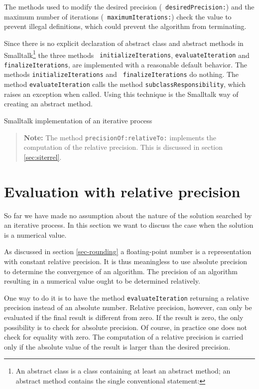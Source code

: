 \documentclass[twoside]{book}
\begin{document}
The methods used to modify the desired precision ({\tt
desiredPrecision:}) and the maximum number of iterations ({\tt
maximumIterations:}) check the value to prevent illegal
definitions, which could prevent the algorithm from terminating.

Since there is no explicit declaration of abstract class and
abstract methods in Smalltalk\footnote{An abstract class is a
class containing at least an abstract method; an abstract method
contains the single conventional statement: \hfil\break{}} the three methods {\tt
initializeIterations}, {\tt evaluateIteration} and {\tt
finalizeIterations}, are implemented with a reasonable default
behavior. The methods {\tt initializeIterations} and {\tt
finalizeIterations} do nothing. The method {\tt evaluateIteration}
calls the method {\tt subclassResponsibility}, which raises an
exception when called. Using this technique is the Smalltalk way
of creating an abstract method.
\begin{listing} Smalltalk implementation of an iterative process
\label{ls:iteration}

\end{listing}
\begin{quote}
{\bf Note:} The method {\tt precisionOf:relativeTo:} implements
the computation of the relative precision. This is discussed in
section \ref{sec:siterrel}.
\end{quote}


\section{Evaluation with relative precision}
\label{sec:iterrel} So far we have made no
assumption about the nature of the solution searched by an
iterative process. In this section we want to discuss the case
when the solution is a numerical value.

As discussed in section \ref{sec-rounding} a floating-point number
is a representation with constant relative precision. It is thus
meaningless to use absolute precision to determine the convergence
of an algorithm. The precision of an algorithm resulting in a
numerical value ought to be determined relatively.

One way to do it is to have the method {\tt evaluateIteration}
returning a relative precision instead of an absolute number.
Relative precision, however, can only be evaluated if the final
result is different from zero. If the result is zero, the only
possibility is to check for absolute precision. Of course, in
practice one does not check for equality with zero. The
computation of a relative precision is carried only if the
absolute value of the result is larger than the desired precision.
\end{document}
